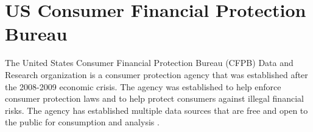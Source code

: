 \section{US Consumer Financial Protection Bureau}

The United States Consumer Financial Protection Bureau (CFPB) Data and Research
organization is a consumer protection agency that was established after the
2008-2009 economic crisis.  The agency was established to help enforce consumer
protection laws and to help protect consumers against illegal financial risks.
The agency has established multiple data sources that are free and open to the
public for consumption and analysis \cite{CFPB2018}.
